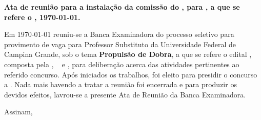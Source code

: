 \documentclass[12pt]{uaefata}
\date{} %
\begin{document}
\begin{letter}{
		\textbf{Ata de reunião para a instalação da comissão do \concurso, para \cargo,  a que se refere o \edital, \today{}.}
	}

\opening{}

Em \today{} reuniu-se a Banca Examinadora do processo seletivo para provimento de vaga para Professor Substituto da Universidade Federal de Campina Grande, sob o tema \textbf{Propulsão de Dobra}, a que se refere o edital \edital, composta pela \prsd, \mba~ e \mbb, para deliberação acerca das atividades pertinentes ao referido concurso. Após iniciados os trabalhos, foi eleito para presidir o concurso a \prsd. Nada mais havendo a tratar a reunião foi encerrada e para produzir os devidos efeitos, lavrou-se a presente Ata de Reunião da Banca Examinadora.  
 
\closing{Assinam,}




\end{letter}
\end{document}
